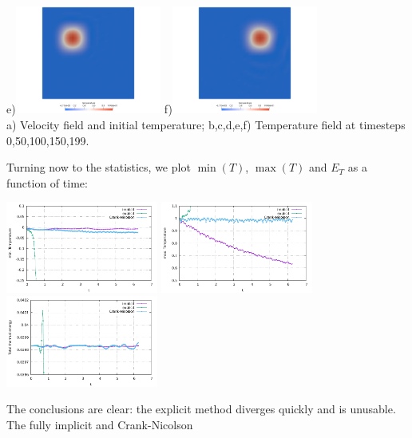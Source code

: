 \begin{center}
e)\includegraphics[width=4.8cm]{python_codes/fieldstone_43/images/crni/crnitemp0050}
f)\includegraphics[width=4.8cm]{python_codes/fieldstone_43/images/crni/crnitemp0199}\\
{\small a) Velocity field and initial temperature; b,c,d,e,f) Temperature field at timesteps 0,50,100,150,199.} 
\end{center}
Turning now to the statistics, we plot $\min(T)$, $\max(T)$ and $E_T$ as a function of time:
\begin{center}
\includegraphics[width=5cm]{python_codes/fieldstone_43/images/Tmin.pdf}
\includegraphics[width=5cm]{python_codes/fieldstone_43/images/Tmax.pdf}
\includegraphics[width=5cm]{python_codes/fieldstone_43/images/ET.pdf}
\end{center}
The conclusions are clear: the explicit method diverges quickly and is unusable. The fully implicit and Crank-Nicolson 
